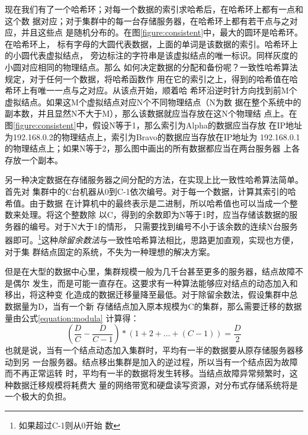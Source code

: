 现在我们有了一个哈希环；对每一个数据的索引求哈希后，在哈希环上都有一点和这个数
据对应；对于集群中的每一台存储服务器，在哈希环上都有若干点与之对应，并且这些点
是随机分布的。在图\ref{figure:consistent}中，最大的圆环是哈希环。在哈希环上，
标有字母的大圆代表数据，上面的单词是该数据的索引。哈希环上的小圆代表虚拟结点，
旁边标注的字符串是该虚拟结点的唯一标识。同样灰度的小圆对应相同的物理结点。那么
如何决定数据的分配和备份呢？一致性哈希算法规定，对于任何一个数据，将哈希函数作
用在它的索引之上，得到的哈希值在哈希环上有唯一一点与之对应。从该点开始，顺着哈
希环沿逆时针方向找到前M个虚拟结点。如果这M个虚拟结点对应N个不同物理结点（N为数
据在整个系统中的副本数，并且显然N不大于M），那么该数据就应当存放在这N个物理结
点上。在图\ref{figure:consistent}中，假设N等于1，那么索引为Alpha的数据应当存放
在IP地址为192.168.0.2的物理结点上，索引为Bravo的数据应当存放在IP地址为
192.168.0.1的物理结点上；如果N等于2，那么图中画出的所有数据都应当在两台服务器
上各存放一个副本。

另一种决定数据在存储服务器之间分配的方法，在实现上比一致性哈希算法简单。首先对
集群中的C台机器从0到C-1依次编号。对于每一个数据，计算其索引的哈希值。由于数据
在计算机中的最终表示是二进制，所以哈希值也可以当成一个整数来处理。将这个整数除
以C，得到的余数即为N等于1时，应当存储该数据的服务器的编号。对于N大于1的情形，
只需要找到编号不小于该余数的连续N台服务器即可。\footnote{如果超过C-1则从0开始
数}这种\emph{除留余数法}与一致性哈希算法相比，思路更加直观，实现也方便，对于集
群结点固定的系统，不失为一种理想的解决方案。

但是在大型的数据中心里，集群规模一般为几千台甚至更多的服务器，结点故障不是偶尔
发生，而是可能一直存在。这要求有一种算法能够应对结点的动态加入和移出，将这种变
化造成的数据迁移量降至最低。对于除留余数法，假设集群中总数据量为D，当有一个新
存储结点加入原本规模为C的集群，那么需要迁移的数据量由公式\ref{equation:modula}
计算得：
\begin{equation}\label{equation:modula}
(\frac{D}{C} - \frac{D}{C - 1}) * (1 + 2 + \dots + (C - 1)) = \frac{D}{2}
\end{equation}
也就是说，当有一个结点动态加入集群时，平均有一半的数据要从原存储服务器移动到另
一台服务器。结点移出集群是加入的逆过程，所以当有一个结点因为故障而不再正常运转
时，平均有一半的数据将发生转移。当结点故障异常频繁时，这种数据迁移规模将耗费大
量的网络带宽和硬盘读写资源，对分布式存储系统将是一个极大的负担。

